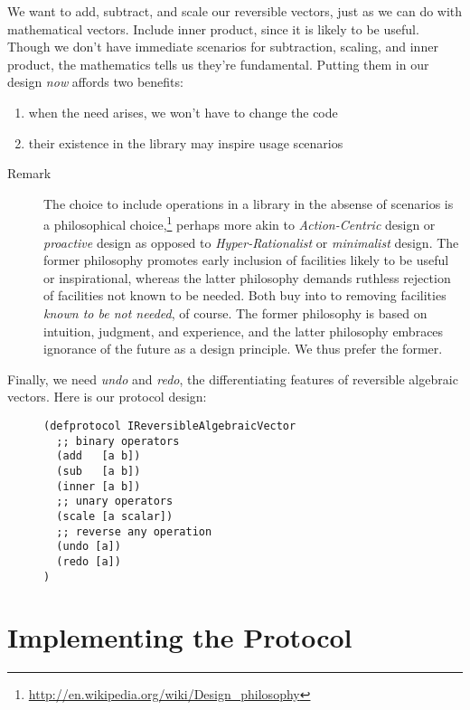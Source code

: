 \documentclass[11pt]{article}
\begin{document}
We want to add, subtract, and scale our reversible vectors, just as we
can do with mathematical vectors.  Include inner product, since it is
likely to be useful.  Though we don't have immediate scenarios for
subtraction, scaling, and inner product, the mathematics tells us
they're fundamental. Putting them in our design \emph{now} affords two
benefits:
\begin{enumerate}
\item when the need arises, we won't have to change the code
\item their existence in the library may inspire usage scenarios
\end{enumerate}



\begin{description}
\item[{Remark}] The choice to include operations in a library in the absense
of scenarios is a philosophical
choice,\footnote{\url{http://en.wikipedia.org/wiki/Design_philosophy}}
perhaps more akin to \emph{Action-Centric} design or \emph{proactive}
design as opposed to \emph{Hyper-Rationalist} or \emph{minimalist}
design. The former philosophy promotes early inclusion of
facilities likely to be useful or inspirational, whereas the
latter philosophy demands ruthless rejection of facilities
not known to be needed. Both buy into to removing facilities
\emph{known to be not needed}, of course. The former philosophy
is based on intuition, judgment, and experience, and the
latter philosophy embraces ignorance of the future as a
design principle. We thus prefer the former.
\end{description}



Finally, we need \emph{undo} and \emph{redo}, the differentiating features of
reversible algebraic vectors. Here is our protocol design:

\begin{figure}[H]
\label{reversible-algebraic-vector-protocol}
\begin{verbatim}
(defprotocol IReversibleAlgebraicVector
  ;; binary operators
  (add   [a b])
  (sub   [a b])
  (inner [a b])
  ;; unary operators
  (scale [a scalar])
  ;; reverse any operation
  (undo [a])
  (redo [a])
)
\end{verbatim}
\end{figure}
\section{Implementing the Protocol}
\label{sec-4}
\end{document}
